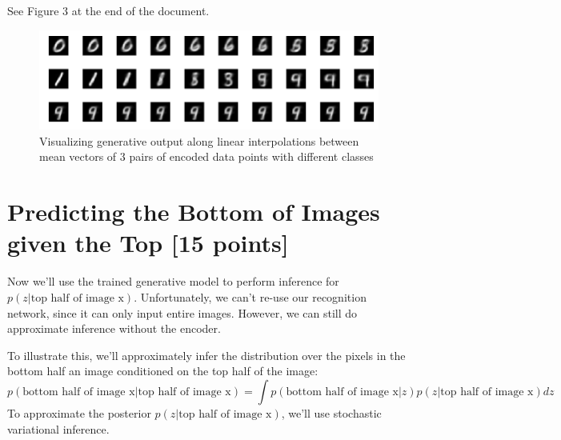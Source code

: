 \documentclass{article}
\begin{document}
\begin{enumerate}[label=(\alph*)]
	See Figure 3 at the end of the document.

	\begin{figure}[h]
		\centering
		\includegraphics[width=\textwidth]{A3Q3c.png}
		\caption{Visualizing generative output along linear interpolations between mean vectors of 3 pairs of encoded data points with different classes}
	\end{figure}
	
\end{enumerate}


\pagebreak

\section{Predicting the Bottom of Images given the Top [15 points]}

Now we'll use the trained generative model to perform inference for $p(z|\text{top half of image x})$.
Unfortunately, we can't re-use our recognition network, since it can only input entire images.
However, we can still do approximate inference without the encoder.

To illustrate this, we'll approximately infer the distribution over the pixels in the bottom half an image conditioned on the top half of the image:
$$p(\text{bottom half of image x} | \text{top half of image x}) = \int p(\text{bottom half of image x} | z) p( z | \text{top half of image x}) dz$$
To approximate the posterior $p( z | \text{top half of image x})$, we'll use stochastic variational inference.
\end{document}
